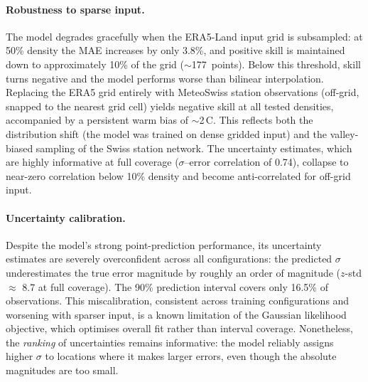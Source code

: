 \paragraph{Robustness to sparse input.}
The model degrades gracefully when the ERA5-Land input grid is subsampled: at 50\% density the MAE increases by only 3.8\%, and positive skill is maintained down to approximately 10\% of the grid (${\sim}$177~points). Below this threshold, skill turns negative and the model performs worse than bilinear interpolation. Replacing the ERA5 grid entirely with MeteoSwiss station observations (off-grid, snapped to the nearest grid cell) yields negative skill at all tested densities, accompanied by a persistent warm bias of ${\sim}$2\,\textdegree C. This reflects both the distribution shift (the model was trained on dense gridded input) and the valley-biased sampling of the Swiss station network. The uncertainty estimates, which are highly informative at full coverage ($\sigma$--error correlation of 0.74), collapse to near-zero correlation below 10\% density and become anti-correlated for off-grid input.

\paragraph{Uncertainty calibration.}
Despite the model's strong point-prediction performance, its uncertainty estimates are severely overconfident across all configurations: the predicted $\sigma$ underestimates the true error magnitude by roughly an order of magnitude ($z$-std $\approx$ 8.7 at full coverage). The 90\% prediction interval covers only 16.5\% of observations. This miscalibration, consistent across training configurations and worsening with sparser input, is a known limitation of the Gaussian likelihood objective, which optimises overall fit rather than interval coverage. Nonetheless, the \emph{ranking} of uncertainties remains informative: the model reliably assigns higher $\sigma$ to locations where it makes larger errors, even though the absolute magnitudes are too small.